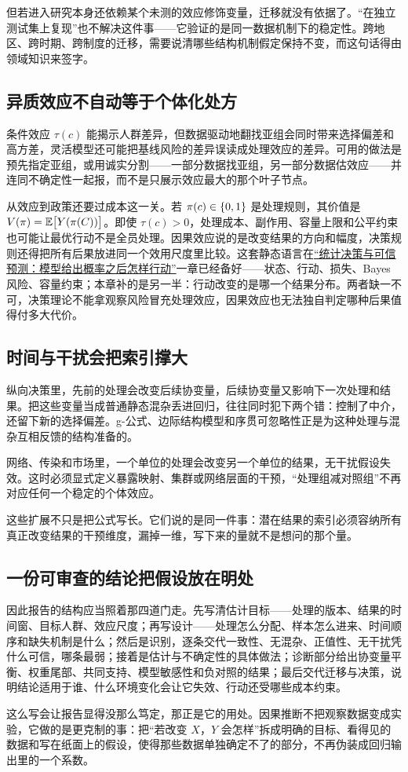 但若进入研究本身还依赖某个未测的效应修饰变量，迁移就没有依据了。``在独立测试集上复现''也不解决这件事——它验证的是同一数据机制下的稳定性。跨地区、跨时期、跨制度的迁移，需要说清哪些结构机制假定保持不变，而这句话得由领域知识来签字。

\subsection{异质效应不自动等于个体化处方}

条件效应 \(\tau(c)\) 能揭示人群差异，但数据驱动地翻找亚组会同时带来选择偏差和高方差，灵活模型还可能把基线风险的差异误读成处理效应的差异。可用的做法是预先指定亚组，或用诚实分割——一部分数据找亚组，另一部分数据估效应——并连同不确定性一起报，而不是只展示效应最大的那个叶子节点。

从效应到政策还要过成本这一关。若 \(\pi(c)\in\left\{0,1\right\}\) 是处理规则，其价值是 \(V(\pi)=\mathbb{E}\bigl[Y(\pi(C))\bigr]\)。即使 \(\tau(c)>0\)，处理成本、副作用、容量上限和公平约束也可能让最优行动不是全员处理。因果效应说的是改变结果的方向和幅度，决策规则还得把所有后果放进同一个效用尺度里比较。这套静态语言在\hyperref[ch:092]{``统计决策与可信预测：模型给出概率之后怎样行动''}一章已经备好——状态、行动、损失、Bayes 风险、容量约束；本章补的是另一半：行动改变的是哪一个结果分布。两者缺一不可，决策理论不能拿观察风险冒充处理效应，因果效应也无法独自判定哪种后果值得付多大代价。

\subsection{时间与干扰会把索引撑大}

纵向决策里，先前的处理会改变后续协变量，后续协变量又影响下一次处理和结果。把这些变量当成普通静态混杂丢进回归，往往同时犯下两个错：控制了中介，还留下新的选择偏差。g-公式、边际结构模型和序贯可忽略性正是为这种处理与混杂互相反馈的结构准备的。

网络、传染和市场里，一个单位的处理会改变另一个单位的结果，无干扰假设失效。这时必须显式定义暴露映射、集群或网络层面的干预，``处理组减对照组''不再对应任何一个稳定的个体效应。

这些扩展不只是把公式写长。它们说的是同一件事：潜在结果的索引必须容纳所有真正改变结果的干预维度，漏掉一维，写下来的量就不是想问的那个量。

\subsection{一份可审查的结论把假设放在明处}

因此报告的结构应当照着那四道门走。先写清估计目标——处理的版本、结果的时间窗、目标人群、效应尺度；再写设计——处理怎么分配、样本怎么进来、时间顺序和缺失机制是什么；然后是识别，逐条交代一致性、无混杂、正值性、无干扰凭什么可信，哪条最弱；接着是估计与不确定性的具体做法；诊断部分给出协变量平衡、权重尾部、共同支持、模型敏感性和负对照的结果；最后交代迁移与决策，说明结论适用于谁、什么环境变化会让它失效、行动还受哪些成本约束。

这么写会让报告显得没那么笃定，那正是它的用处。因果推断不把观察数据变成实验，它做的是更克制的事：把``若改变 \(X\)，\(Y\) 会怎样''拆成明确的目标、看得见的数据和写在纸面上的假设，使得那些数据单独确定不了的部分，不再伪装成回归输出里的一个系数。
